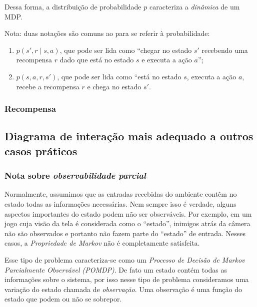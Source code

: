 \documentclass{article}
\begin{document}
                Dessa forma, a distribuição de probabilidade $p$ caracteriza a \emph{dinâmica} de um MDP.
            
                Nota: duas notações são comuns ao para se referir à probabilidade:
                
                \begin{enumerate}
                    \item $p(s', r \mid s, a)$, que pode ser lida como ``chegar no estado $s'$ recebendo uma recompensa $r$ dado que está no estado $s$ e executa a ação $a$'';
                    \item $p(s, a, r, s')$, que pode ser lida como ``está no estado $s$, executa a ação $a$, recebe a recompensa $r$ e chega no estado $s'$.
                \end{enumerate}
                
            \subsubsection{Recompensa}
        
                
        \subsection{Diagrama de interação mais adequado a outros casos práticos}
        
            \subsubsection{Nota sobre \emph{observabilidade parcial}}

                Normalmente, assumimos que as entradas recebidas do ambiente contêm no estado todas as informações necessárias. Nem sempre isso é verdade, alguns aspectos importantes do estado podem não ser observáveis. Por exemplo, em um jogo cuja visão da tela é considerada como o ``estado'', inimigos atrás da câmera não são observados e portanto não fazem parte do ``estado'' de entrada. Nesses casos, a \emph{Propriedade de Markov} não é completamente satisfeita. 
                
                Esse tipo de problema caracteriza-se como um \emph{Processo de Decisão de Markov Parcialmente Observável (POMDP)}. De fato um estado contém todas as informações sobre o sistema, por isso nesse tipo de problema consideramos uma variação do estado chamada de \emph{observação}. Uma observação é uma função do estado que podem ou não se sobrepor.
                
\end{document}
